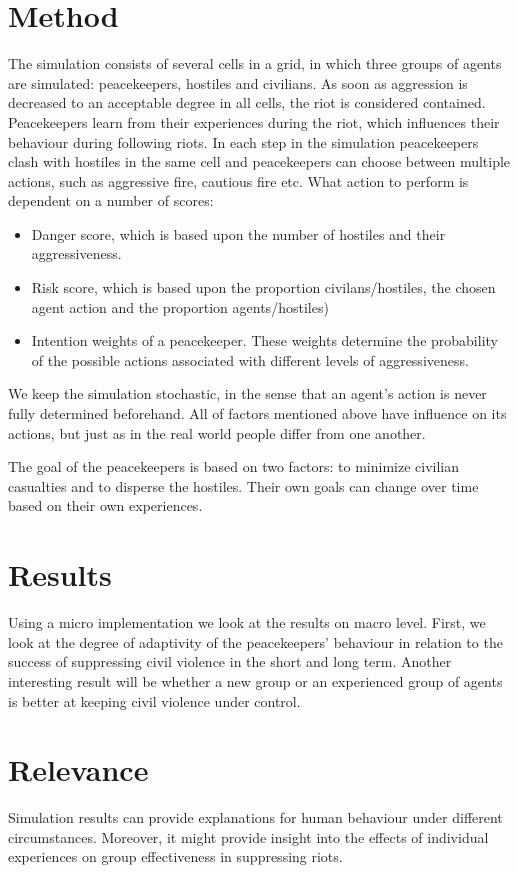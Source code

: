 \documentclass[11pt,a4paper]{article}
\begin{document}
	\section{Method}
		The simulation consists of several cells in a grid, in which three groups of agents are simulated: peacekeepers, hostiles and civilians. As soon as aggression is decreased to an acceptable degree in all cells, the riot is considered contained. Peacekeepers learn from their experiences during the riot, which influences their behaviour during following riots. In each step in the simulation peacekeepers clash with hostiles in the same cell and peacekeepers can choose between multiple actions, such as aggressive fire, cautious fire etc. What action to perform is dependent on a number of scores:
		
		\begin{itemize}
			\item Danger score, which is based upon the number of hostiles and their aggressiveness.
			\item Risk score, which is based upon the proportion civilans/hostiles, the chosen agent action and the proportion agents/hostiles)
			\item Intention weights of a peacekeeper. These weights determine the probability of the possible actions associated with different levels of aggressiveness.
		\end{itemize}
		
		We keep the simulation stochastic, in the sense that an agent's action is never fully determined beforehand. All of factors mentioned above have influence on its actions, but just as in the real world people differ from one another.
	
		The goal of the peacekeepers is based on two factors: to minimize civilian casualties and to disperse the hostiles. Their own goals can change over time based on their own experiences. 
		
	\section{Results}
		Using a micro implementation we look at the results on macro level.
		First, we look at the degree of adaptivity of the peacekeepers' behaviour in relation to the success of suppressing civil violence in the short and long term. 
		Another interesting result will be whether a new group or an experienced group of agents is better at keeping civil violence under control.
		
	\section{Relevance}
		Simulation results can provide explanations for human behaviour under different circumstances. Moreover, it might provide insight into the effects of individual experiences on group effectiveness in suppressing riots.
		
	
	
\end{document}
